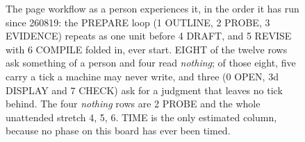 \begin{figure}[t]
  \centering
  
  \caption{The page workflow as a person experiences it, in the order it has run
  since 260819: the PREPARE loop (1 OUTLINE, 2 PROBE, 3 EVIDENCE) repeats as one
  unit before 4 DRAFT, and 5 REVISE with 6 COMPILE folded in, ever start. EIGHT
  of the twelve rows ask something of a person and four read \emph{nothing}; of
  those eight, five carry a tick a machine may never write, and three (0 OPEN,
  3d DISPLAY and 7 CHECK) ask for a judgment that leaves no tick behind. The
  four \emph{nothing} rows are 2 PROBE and the whole unattended stretch 4, 5, 6.
  TIME is the only estimated column, because no phase on this board has ever
  been timed.}
  \label{fig:qpw00-who-does-what}
\end{figure}
